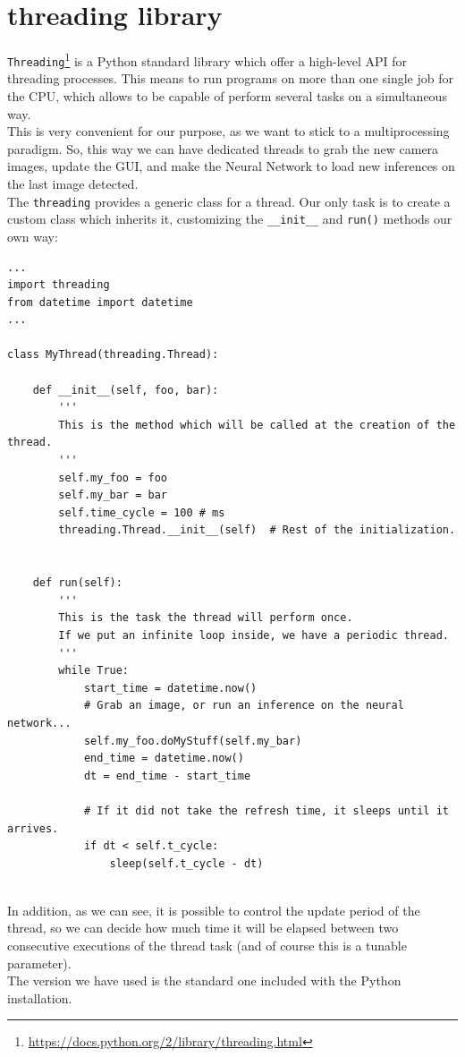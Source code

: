 \section{threading library}
	\label{sec:3_threading}
	\texttt{Threading}\footnote{\url{https://docs.python.org/2/library/threading.html}} is a Python standard library which offer a high-level API for threading processes. This means to run programs on more than one single job for the CPU, which allows to be capable of perform several tasks on a simultaneous way.\\
	
	This is very convenient for our purpose, as we want to stick to a multiprocessing paradigm. So, this way we can have dedicated threads to grab the new camera images, update the GUI, and make the Neural Network to load new inferences on the last image detected.\\
	
	The \texttt{threading} provides a generic class for a thread. Our only task is to create a custom class which inherits it, customizing the \texttt{\_\_init\_\_} and \texttt{run()} methods our own way:
	

	\begin{lstlisting}
...
import threading
from datetime import datetime
...

class MyThread(threading.Thread):

	def __init__(self, foo, bar):
		'''
		This is the method which will be called at the creation of the thread.
		'''
		self.my_foo = foo
		self.my_bar = bar
		self.time_cycle = 100 # ms
		threading.Thread.__init__(self)  # Rest of the initialization.
		
		
	def run(self):
		'''
		This is the task the thread will perform once.
		If we put an infinite loop inside, we have a periodic thread.
		'''
		while True:
			start_time = datetime.now()
			# Grab an image, or run an inference on the neural network...
			self.my_foo.doMyStuff(self.my_bar)
			end_time = datetime.now()
			dt = end_time - start_time
			
			# If it did not take the refresh time, it sleeps until it arrives.
			if dt < self.t_cycle:
				sleep(self.t_cycle - dt)
				
	\end{lstlisting}
	
In addition, as we can see, it is possible to control the update period of the thread, so we can decide how much time it will be elapsed between two consecutive executions of the thread task (and of course this is a tunable parameter).\\

The version we have used is the standard one included with the Python installation.

